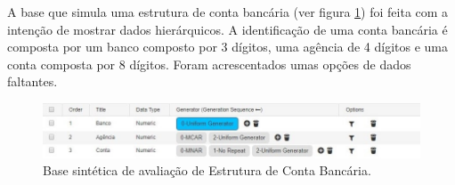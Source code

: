 \documentclass[
	12pt,				%
	openright,			%
	twoside,			%
	a4paper,			%
	english,			%
	brazil				%
	]{abntex2}
\begin{document}
		A base que simula uma estrutura de conta bancária (ver figura \ref{fig:BancoModelo}) foi feita com a intenção de mostrar dados hierárquicos.
		A identificação de uma conta bancária é composta por um banco composto por 3 dígitos,
		uma agência de 4 dígitos e uma conta composta por 8 dígitos.
		Foram acrescentados umas opções de dados faltantes.
		\begin{figure}[h!]
			\centering
			\includegraphics[width=\linewidth]{./figures/Resultados/BancoModelo.jpg}
			\caption{Base sintética de avaliação de Estrutura de Conta Bancária.}
			\label{fig:BancoModelo}
		\end{figure}
\end{document}
